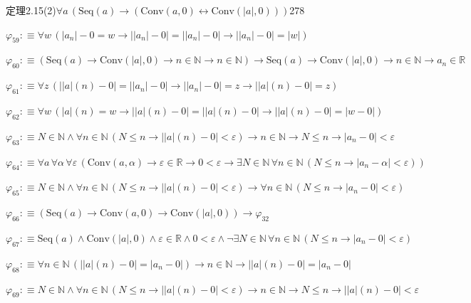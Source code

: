 \begin{fullproof}{定理2.15(2)}{$\forall a\,(\mathrm{Seq}(a) \to (\mathrm{Conv}(a,0) \leftrightarrow \mathrm{Conv}(\lvert a \rvert,0)))$}{278}
\begin{abbrevlist}
\item $\varphi_{59} :\equiv \forall w\,(\lvert a_{n} \rvert - 0 = w \to \lvert \lvert a_{n} \rvert - 0 \rvert = \lvert \lvert a_{n} \rvert - 0 \rvert \to \lvert \lvert a_{n} \rvert - 0 \rvert = \lvert w \rvert)$
\item $\varphi_{60} :\equiv (\mathrm{Seq}(a) \to \mathrm{Conv}(\lvert a \rvert,0) \to n \in \mathbb{N} \to n \in \mathbb{N}) \to \mathrm{Seq}(a) \to \mathrm{Conv}(\lvert a \rvert,0) \to n \in \mathbb{N} \to a_{n} \in \mathbb{R}$
\item $\varphi_{61} :\equiv \forall z\,(\lvert \lvert a \rvert(n) - 0 \rvert = \lvert \lvert a_{n} \rvert - 0 \rvert \to \lvert \lvert a_{n} \rvert - 0 \rvert = z \to \lvert \lvert a \rvert(n) - 0 \rvert = z)$
\item $\varphi_{62} :\equiv \forall w\,(\lvert a \rvert(n) = w \to \lvert \lvert a \rvert(n) - 0 \rvert = \lvert \lvert a \rvert(n) - 0 \rvert \to \lvert \lvert a \rvert(n) - 0 \rvert = \lvert w - 0 \rvert)$
\item $\varphi_{63} :\equiv N \in \mathbb{N} \land \forall n \in \mathbb{N}\,(N \leq n \to \lvert \lvert a \rvert(n) - 0 \rvert < \varepsilon) \to n \in \mathbb{N} \to N \leq n \to \lvert a_{n} - 0 \rvert < \varepsilon$
\item $\varphi_{64} :\equiv \forall a\,\forall \alpha\,\forall \varepsilon\,(\mathrm{Conv}(a,\alpha) \to \varepsilon \in \mathbb{R} \to 0 < \varepsilon \to \exists N \in \mathbb{N}\,\forall n \in \mathbb{N}\,(N \leq n \to \lvert a_{n} - \alpha \rvert < \varepsilon))$
\item $\varphi_{65} :\equiv N \in \mathbb{N} \land \forall n \in \mathbb{N}\,(N \leq n \to \lvert \lvert a \rvert(n) - 0 \rvert < \varepsilon) \to \forall n \in \mathbb{N}\,(N \leq n \to \lvert a_{n} - 0 \rvert < \varepsilon)$
\item $\varphi_{66} :\equiv (\mathrm{Seq}(a) \to \mathrm{Conv}(a,0) \to \mathrm{Conv}(\lvert a \rvert,0)) \to \varphi_{32}$
\item $\varphi_{67} :\equiv \mathrm{Seq}(a) \land \mathrm{Conv}(\lvert a \rvert,0) \land \varepsilon \in \mathbb{R} \land 0 < \varepsilon \land \neg \exists N \in \mathbb{N}\,\forall n \in \mathbb{N}\,(N \leq n \to \lvert a_{n} - 0 \rvert < \varepsilon)$
\item $\varphi_{68} :\equiv \forall n \in \mathbb{N}\,(\lvert \lvert a \rvert(n) - 0 \rvert = \lvert a_{n} - 0 \rvert) \to n \in \mathbb{N} \to \lvert \lvert a \rvert(n) - 0 \rvert = \lvert a_{n} - 0 \rvert$
\item $\varphi_{69} :\equiv N \in \mathbb{N} \land \forall n \in \mathbb{N}\,(N \leq n \to \lvert \lvert a \rvert(n) - 0 \rvert < \varepsilon) \to n \in \mathbb{N} \to N \leq n \to \lvert \lvert a \rvert(n) - 0 \rvert < \varepsilon$

\end{abbrevlist}
\end{fullproof}
